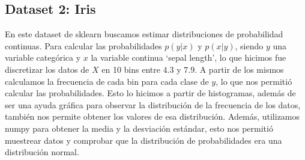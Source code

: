 \documentclass[11pt]{article}
\begin{document}
\subsection{Dataset 2: Iris}
En este dataset de sklearn buscamos estimar distribuciones de probabilidad continuas. Para calcular las probabilidades $p(y|x)$ y $p(x|y)$, siendo $y$ una variable categórica y $x$ la variable continua `sepal length’, lo que hicimos fue discretizar los datos de $X$ en 10 bins entre $4.3$ y $7.9$. A partir de los mismos calculamos la frecuencia de cada bin para cada clase de $y$, lo que nos permitió calcular las probabilidades. Esto lo hicimos a partir de histogramas, además de ser una ayuda gráfica para observar la distribución de la frecuencia de los datos, también nos permite obtener los valores de esa distribución. Además, utilizamos numpy para obtener la media y la desviación estándar, esto nos permitió muestrear datos y comprobar que la distribución de probabilidades era una distribución normal.  
\end{document}
